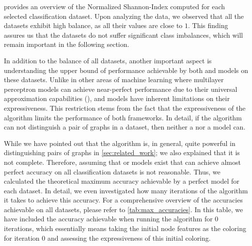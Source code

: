  provides an overview of the \textsf{Normalized Shannon-Index} computed for each selected classification dataset. Upon analyzing the data, we observed that all the datasets exhibit high balance, as all their values are close to $1$. This finding assures us that the datasets do not suffer significant class imbalances, which will remain important in the following section.

In addition to the balance of all datasets, another important aspect is understanding the upper bound of performance achievable by both \gnn and \wlnn models on these datasets. Unlike in other areas of machine learning where multilayer perceptron models can achieve near-perfect performance due to their universal approximation capabilities (\cite{Hornik1991}), \gnn and \wlnn models have inherent limitations on their expressiveness. This restriction stems from the fact that the expressiveness of the \wl algorithm limits the performance of both frameworks. In detail, if the \wl algorithm can not distinguish a pair of graphs in a dataset, then neither a \gnn nor a \wlnn model can.

While we have pointed out that the \wl algorithm is, in general, quite powerful in distinguishing pairs of graphs in \cref{sec:related_work}; we also explained that it is not complete. Therefore, assuming that \gnn or \wlnn models exist that can achieve almost perfect accuracy on all classification datasets is not reasonable. Thus, we calculated the theoretical maximum accuracy achievable by a perfect model for each dataset. In detail, we even investigated how many iterations of the \wl algorithm it takes to achieve this accuracy. For a comprehensive overview of the accuracies achievable on all datasets, please refer to \cref{tab:max_accuracies}. In this table, we have included the accuracy achievable when running the \wl algorithm for $0$ iterations, which essentially means taking the initial node features as the coloring for iteration $0$ and assessing the expressiveness of this initial coloring.

